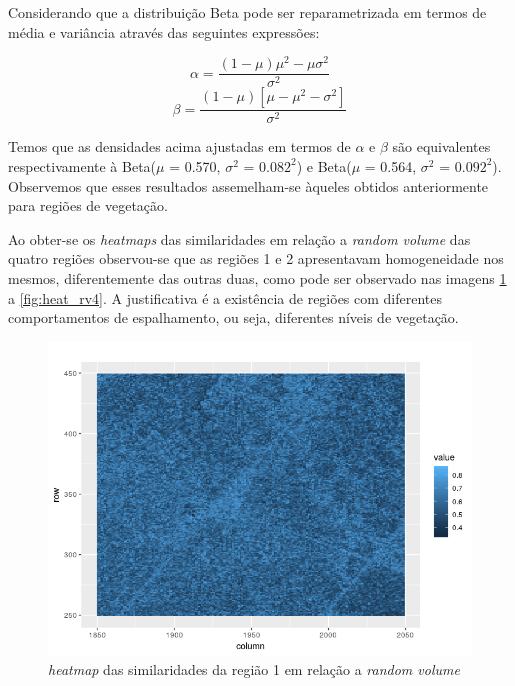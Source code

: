 \documentclass[12pt]{article}
\begin{document}
Considerando que a distribuição Beta pode ser reparametrizada em termos de média e variância através das seguintes expressões:

\begin{equation*}
{\alpha} = \frac{(1 - \mu) {\mu}^2 - \mu {\sigma}^2}{{\sigma}^2}
\end{equation*}
\begin{equation*}
{\beta} = \frac{(1 - \mu)[\mu - {\mu}^2 - {\sigma}^2]}{{\sigma}^2}
\end{equation*}
 
Temos que as densidades acima ajustadas em termos de ${\alpha}$ e ${\beta}$ são equivalentes respectivamente à Beta($\mu$ = 0.570, ${\sigma}^2$ = $0.082^2$) e Beta($\mu$ = 0.564, ${\sigma}^2$ = $0.092^2$). Observemos que esses resultados assemelham-se àqueles obtidos anteriormente para regiões de vegetação.

Ao obter-se os \textit{heatmaps} das similaridades em relação a \textit{random volume} das quatro regiões observou-se que as regiões 1 e 2 apresentavam homogeneidade nos mesmos, diferentemente das outras duas, como pode ser observado nas imagens \ref{fig:heat_rv1} a \ref{fig:heat_rv4}. A justificativa é a existência de regiões com diferentes comportamentos de espalhamento, ou seja, diferentes níveis de vegetação.

\begin{figure}[!h]

  \centering
  \includegraphics[width=0.8\linewidth]{../../Images/Report_19_02_27/heatmap_rv_region1.png}
  \caption{\textit{heatmap} das similaridades da região 1 em relação a \textit{random volume}}
  \label{fig:heat_rv1}

\end{figure}
\end{document}
